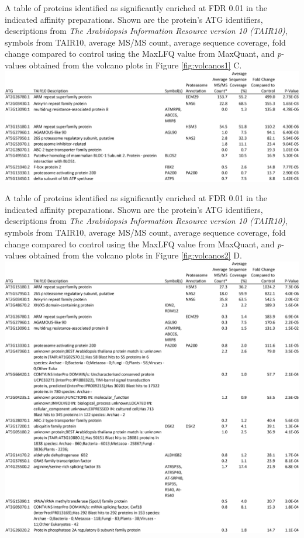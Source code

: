 \begin{table}
	{A table of proteins identified as significantly enriched at FDR 0.01 in the indicated affinity preparations.  Shown are the protein's ATG identifiers, descriptions from \textit{The Arabidopsis Information Resource version 10 (TAIR10)}, symbols from TAIR10, average MS/MS count, average sequence coverage, fold change compared to control using the MaxLFQ value from MaxQuant, and \textit{p}-values obtained from the volcano plots in Figure \ref{fig:volcanos1} C.}
\includegraphics[width=\columnwidth]{Proteasome/rpt4aminus.png}
\label{table:rpt4aminus}
\end{table}
\clearpage

\begin{table}
	{A table of proteins identified as significantly enriched at FDR 0.01 in the indicated affinity preparations.  Shown are the protein's ATG identifiers, descriptions from \textit{The Arabidopsis Information Resource version 10 (TAIR10)}, symbols from TAIR10, average MS/MS count, average sequence coverage, fold change compared to control using the MaxLFQ value from MaxQuant, and \textit{p}-values obtained from the volcano plots in Figure \ref{fig:volcanos2} D.}
\includegraphics[width=\columnwidth]{Proteasome/rpt4aplus.png}
\label{table:prpt4aplus}
\end{table}
\clearpage

